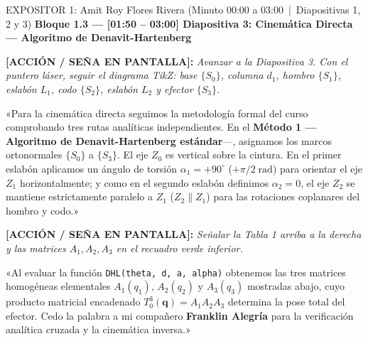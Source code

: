 \documentclass[11pt,a4paper]{article}
\newcommand{\accion}[1]{%
  \par\smallskip\noindent%
  {\color{uniGranate}\textbf{[ACCIÓN / SEÑA EN PANTALLA]:}} {\itshape\color{uniAzul!90!black} #1}\par\smallskip%
}
\newcommand{\speech}[1]{%
  \noindent{\color{verdeOk!85!black}\textbf{[SPEECH]:}} «#1»\par\medskip%
}
\begin{document}
\begin{cajaexpositor}[uniAzul]{EXPOSITOR 1: Amit Roy Flores Rivera (Minuto 00:00 a 03:00 \,|\, Diapositivas 1, 2 y 3)}
\textbf{\color{uniAzul}Bloque 1.3 --- [01:50 -- 03:00] Diapositiva 3: Cinemática Directa --- Algoritmo de Denavit-Hartenberg}
\accion{Avanzar a la Diapositiva 3. Con el puntero láser, seguir el diagrama TikZ: base $\{S_0\}$, columna $d_1$, hombro $\{S_1\}$, eslabón $L_1$, codo $\{S_2\}$, eslabón $L_2$ y efector $\{S_3\}$.}
\speech{Para la cinemática directa seguimos la metodología formal del curso comprobando tres rutas analíticas independientes. En el \textbf{Método 1 —Algoritmo de Denavit-Hartenberg estándar}—, asignamos los marcos ortonormales $\{S_0\}$ a $\{S_3\}$. El eje $Z_0$ es vertical sobre la cintura. En el primer eslabón aplicamos un ángulo de torsión $\alpha_1 = +90^\circ$ ($+\pi/2\;\text{rad}$) para orientar el eje $Z_1$ horizontalmente; y como en el segundo eslabón definimos $\alpha_2 = 0$, el eje $Z_2$ se mantiene estrictamente paralelo a $Z_1$ ($Z_2 \parallel Z_1$) para las rotaciones coplanares del hombro y codo.}

\accion{Señalar la Tabla 1 arriba a la derecha y las matrices $A_1, A_2, A_3$ en el recuadro verde inferior.}
\speech{Al evaluar la función \texttt{DHL(theta, d, a, alpha)} obtenemos las tres matrices homogéneas elementales $A_1(q_1)$, $A_2(q_2)$ y $A_3(q_3)$ mostradas abajo, cuyo producto matricial encadenado $T_0^3(\bm{q}) = A_1 A_2 A_3$ determina la pose total del efector. Cedo la palabra a mi compañero \textbf{Franklin Alegría} para la verificación analítica cruzada y la cinemática inversa.}
\end{cajaexpositor}
\end{document}

